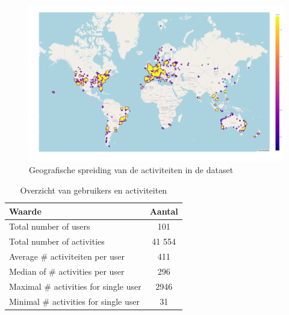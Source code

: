 \begin{figure}[h]
    \centering
    \includegraphics[width=\textwidth]{fig/Afwijkingen&Analyses/Heatmap.png}
    \caption{Geografische spreiding van de activiteiten in de dataset}\label{fig:geographic_spread}
\end{figure}
\begin{table}[h]
    \centering
    \begin{tabular}{|l||c|}
        \hline
        \textbf{Waarde}                       & \textbf{Aantal} \\
        \hline \hline
        Total number of users                 & 101             \\
        \hline
        Total number of activities            & 41 554          \\
        \hline
        Average \# activiteiten per user      & 411             \\
        \hline
        Median of \# activities per user      & 296             \\
        \hline
        Maximal \# activities for single user & 2946            \\
        \hline
        Minimal \# activities for single user & 31              \\
        \hline
    \end{tabular}
    \captionsetup{justification=centering}
    \caption{Overzicht van gebruikers en activiteiten}\label{tab:stats_dataset}
\end{table}
